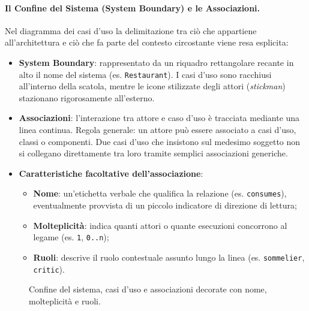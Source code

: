 \documentclass[12pt]{extarticle}
\newcommand{\actor}[4]{\begin{scope}[shift={(#2,#3)}]
  \node[circle,draw,semithick,minimum size=0.4cm,inner sep=0] at (0,0.55) {};
  \draw[semithick] (0,0.35)--(0,-0.2) (-0.3,0.15)--(0.3,0.15) (0,-0.2)--(-0.25,-0.7) (0,-0.2)--(0.25,-0.7);
  \node[minimum width=0.8cm,minimum height=1.4cm] (#1) at (0,0) {};
  \node[font=\footnotesize\sffamily,anchor=north,align=center] at (0,-0.75) {#4};
\end{scope}}
\begin{document}
\paragraph{Il Confine del Sistema (System Boundary) e le Associazioni.}
Nel diagramma dei casi d'uso la delimitazione tra ciò che appartiene all'architettura e ciò che fa parte del contesto circostante viene resa esplicita:
\begin{itemize}
    \item \textbf{System Boundary}: rappresentato da un riquadro rettangolare recante in alto il nome del sistema (es. \texttt{Restaurant}). I casi d'uso sono racchiusi all'interno della scatola, mentre le icone stilizzate degli attori (\textit{stickman}) stazionano rigorosamente all'esterno.
    \item \textbf{Associazioni}: l'interazione tra attore e caso d'uso è tracciata mediante una linea continua. Regola generale: un attore può essere associato a casi d'uso, classi o componenti. Due casi d'uso che insistono sul medesimo soggetto non si collegano direttamente tra loro tramite semplici associazioni generiche.
    \item \textbf{Caratteristiche facoltative dell'associazione}:
    \begin{itemize}
        \item \textbf{Nome}: un'etichetta verbale che qualifica la relazione (es. \texttt{consumes}), eventualmente provvista di un piccolo indicatore di direzione di lettura;
        \item \textbf{Molteplicità}: indica quanti attori o quante esecuzioni concorrono al legame (es. \texttt{1}, \texttt{0..n});
        \item \textbf{Ruoli}: descrive il ruolo contestuale assunto lungo la linea (es. \texttt{sommelier}, \texttt{critic}).
    \end{itemize}
\end{itemize}

\begin{figure}[H]
    \centering
{}
    \caption{Confine del sistema, casi d'uso e associazioni decorate con nome, molteplicità e ruoli.}
    \label{fig:uml_system_associations}
\end{figure}
\end{document}
